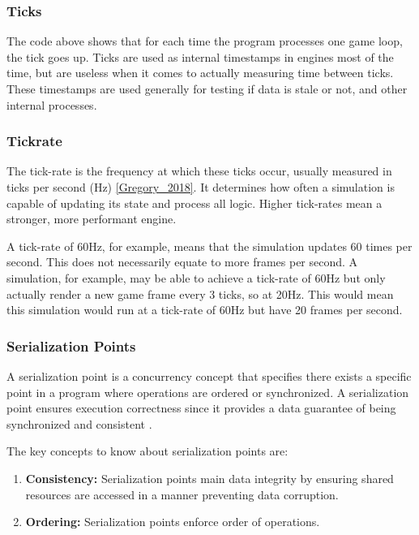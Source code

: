 \subsubsection{Ticks}

The code above shows that for each time the program processes one game loop, the tick goes up. Ticks are used as internal timestamps in engines most of the time, but are useless when it comes to actually measuring time between ticks. These timestamps are used generally for testing if data is stale or not, and other internal processes. 

\subsubsection{Tickrate}

The tick-rate is the frequency at which these ticks occur, usually measured in ticks per second (Hz) \ref{Gregory_2018}. It determines how often a simulation is capable of updating its state and process all logic. Higher tick-rates mean a stronger, more performant engine. 

A tick-rate of 60Hz, for example, means that the simulation updates 60 times per second. This does not necessarily equate to more frames per second. A simulation, for example, may be able to achieve a tick-rate of 60Hz but only actually render a new game frame every 3 ticks, so at 20Hz. This would mean this simulation would run at a tick-rate of 60Hz but have 20 frames per second. 

\subsubsection{Serialization Points}
A serialization point is a concurrency concept that specifies there exists a specific point in a program where operations are ordered or synchronized. A serialization point ensures execution correctness since it provides a data guarantee of being synchronized and consistent \cite{Herlihy_2021b}.

The key concepts to know about serialization points are:
\begin{enumerate}
    \item \textbf{Consistency:} Serialization points main data integrity by ensuring shared resources are accessed in a manner preventing data corruption.
    \item \textbf{Ordering:} Serialization points enforce order of operations.
\end{enumerate}

